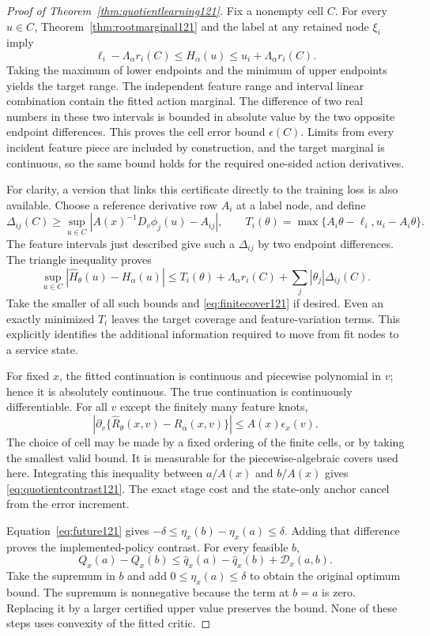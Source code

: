 \begin{proof}[Proof of Theorem~\ref{thm:quotientlearning121}]
Fix a nonempty cell \(C\).  For every \(u\in C\),
Theorem~\ref{thm:rootmarginal121} and the label at any
retained node \(\xi_i\) imply
\[
 \ell_i-\Lambda_\alpha r_i(C)
   \leq H_\alpha(u)\leq
       u_i+\Lambda_\alpha r_i(C).
\]
Taking the maximum of lower endpoints and the
minimum of upper endpoints yields the target range.
The independent feature range and interval linear
combination contain the fitted action marginal.
The difference of two real numbers in these two
intervals is bounded in absolute value by the two
opposite endpoint differences.  This proves the
cell error bound \(\epsilon(C)\).
Limits from every incident feature piece are included
by construction, and the target marginal is
continuous, so the same bound holds for the required
one-sided action derivatives.

For clarity, a version that links this certificate
directly to the training loss is also available.
Choose a reference derivative row \(A_i\) at a label
node, and define
\[
 \Delta_{ij}(C)\geq
   \sup_{u\in C}
      |A(x)^{-1}D_v\phi_j(u)-A_{ij}|,
 \qquad
 T_i(\theta)=\max\{A_i\theta-\ell_i,u_i-A_i\theta\}.
\]
The feature intervals just described give such a
\(\Delta_{ij}\) by two endpoint differences.
The triangle inequality proves
\begin{equation}\label{eq:nodetocell121}
 \sup_{u\in C}|\widehat H_\theta(u)-H_\alpha(u)|
 \leq T_i(\theta)+\Lambda_\alpha r_i(C)
                 +\sum_j|\theta_j|\Delta_{ij}(C).
\end{equation}
Take the smaller of all such bounds and
\eqref{eq:finitecover121} if desired.
Even an exactly minimized \(T_i\) leaves the target
coverage and feature-variation terms.
This explicitly identifies the additional information
required to move from fit nodes to a service state.

For fixed \(x\), the fitted continuation is continuous
and piecewise polynomial in \(v\); hence it is
absolutely continuous.  The true continuation is
continuously differentiable.
For all \(v\) except the finitely many feature knots,
\[
 \left|\partial_v
    \{\widehat R_\theta(x,v)-R_\alpha(x,v)\}\right|
             \leq A(x)\epsilon_x(v).
\]
The choice of cell may be made by a fixed ordering
of the finite cells, or by taking the smallest valid
bound.  It is measurable for the piecewise-algebraic
covers used here.
Integrating this inequality between \(a/A(x)\) and
\(b/A(x)\) gives
\eqref{eq:quotientcontrast121}.
The exact stage cost and the state-only anchor
cancel from the error increment.

Equation~\eqref{eq:future121} gives
\(-\delta\leq\eta_x(b)-\eta_x(a)\leq\delta\).
Adding that difference proves the implemented-policy
contrast.  For every feasible \(b\),
\[
 Q_x(a)-Q_x(b)
 \leq\widehat q_x(a)-\widehat q_x(b)+\mathcal D_x(a,b).
\]
Take the supremum in \(b\) and add
\(0\leq\eta_x(a)\leq\delta\) to obtain the original
optimum bound.  The supremum is nonnegative because
the term at \(b=a\) is zero.
Replacing it by a larger certified upper value
preserves the bound.  None of these steps uses
convexity of the fitted critic.
\end{proof}

